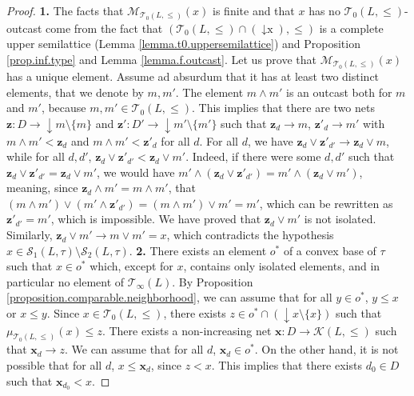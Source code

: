 \documentclass{article}
\begin{document}
\begin{proof}
\textbf{1.} The facts that $\mathcal{M}_{\mathcal{T}_0(L,\le)}(x)$ is finite and that $x$ has no $\mathcal{T}_0(L,\le)$-outcast come from the fact that $(\mathcal{T}_0(L,\le) \cap (\mathop{\downarrow x}),\le)$ is a complete upper semilattice (Lemma \ref{lemma.t0.uppersemilattice}) and Proposition \ref{prop.inf.type} and Lemma \ref{lemma.f.outcast}. Let us prove that $\mathcal{M}_{\mathcal{T}_0(L,\le)}(x)$ has a unique element. Assume ad absurdum that it has at least two distinct elements, that we denote by $m,m'$. The element $m \wedge m'$ is an outcast both for $m$ and $m'$, because $m,m' \in \mathcal{T}_0(L,\le)$. This implies that 
there are two nets $\boldsymbol{z}: D \rightarrow \mathop{\downarrow}m \setminus \{m\}$ and $\boldsymbol{z}' : D' \rightarrow \mathop{\downarrow}m' \setminus \{m'\}$ such that $\boldsymbol{z}_d \rightarrow m$, $\boldsymbol{z}'_d \rightarrow m'$ with $m \wedge m' < \boldsymbol{z}_d$ and $m \wedge m' < \boldsymbol{z}'_d$ for all $d$.
For all $d$, we have $\boldsymbol{z}_d \vee \boldsymbol{z}'_{d'} \rightarrow \boldsymbol{z}_d \vee m$, while for all $d,d'$, $\boldsymbol{z}_d \vee \boldsymbol{z}'_{d'} < \boldsymbol{z}_d \vee m'$. 
Indeed, if there were some $d,d'$ such that $\boldsymbol{z}_d \vee \boldsymbol{z}'_{d'} = \boldsymbol{z}_d \vee m'$, we would have $m' \wedge (\boldsymbol{z}_d \vee \boldsymbol{z}'_{d'})= m' \wedge (\boldsymbol{z}_d\vee m')$, meaning, since $\boldsymbol{z}_d \wedge m' = m \wedge m'$, that 
$(m \wedge m') \vee (m' \wedge \boldsymbol{z}'_{d'}) = (m\wedge m') \vee m' = m'$, which can be rewritten 
as $\boldsymbol{z}'_{d'} = m'$, which is impossible.
We have proved that $\boldsymbol{z}_d \vee m'$ is not isolated. Similarly, $\boldsymbol{z}_d \vee m' \rightarrow m \vee m' = x$, which contradicts the hypothesis $x \in \mathcal{S}_1(L,\tau) \setminus \mathcal{S}_2(L,\tau)$.
 \textbf{2.} There exists an element $o^*$ of a convex base of $\tau$ such that $x \in o^*$ which, except for $x$, contains only isolated elements, and in particular no element of $\mathcal{T}_{\infty}(L)$. By Proposition \ref{proposition.comparable.neighborhood}, we can assume that for all $y \in o^*$, $y \le x$ or $x \le y$. Since $x \in \mathcal{T}_0(L,\le)$, there exists $z \in o^* \cap (\mathop{\downarrow}x \setminus \{x\})$ such that $\mu_{\mathcal{T}_0(L,\le)}(x) \le z$. There exists a non-increasing net $\boldsymbol{x} : D \rightarrow \mathcal{K}(L,\le)$ such that $\boldsymbol{x}_d \rightarrow z$.
We can assume that for all $d$, $\boldsymbol{x}_d \in o^*$. 
On the other hand, it is not possible that for all $d$, $x \le \boldsymbol{x}_d$, since $z < x$. This implies that there exists $d_0 \in D$ such that $\boldsymbol{x}_{d_0} < x$. 

\end{proof}
\end{document}

